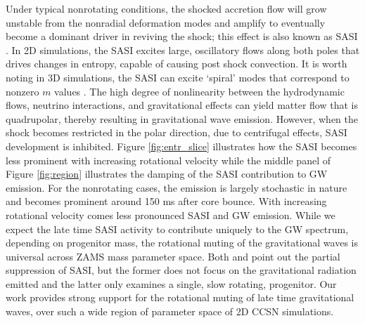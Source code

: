 \documentclass[twocolumn,times]{aastex62}  %
\begin{document}
Under typical nonrotating conditions, the shocked accretion flow will grow unstable from the nonradial deformation modes and amplify to eventually become a dominant driver in reviving the shock; this effect is also known as SASI \citep{scheck:2008,marek:2009a}.  In 2D simulations, the SASI excites large, oscillatory flows along both poles that drives changes in entropy, capable of causing post shock convection.  It is worth noting in 3D simulations, the SASI can excite `spiral' modes that correspond to nonzero $m$ values \citep{blondin:2007,kuroda:2016}.  The high degree of nonlinearity between the hydrodynamic flows, neutrino interactions, and gravitational effects can yield matter flow that is quadrupolar, thereby resulting in gravitational wave emission.  However, when the shock becomes restricted in the polar direction, due to centrifugal effects, SASI development is inhibited. Figure \ref{fig:entr_slice} illustrates how the SASI becomes less prominent with increasing rotational velocity while the middle panel of Figure \ref{fig:region} illustrates the damping of the SASI contribution to GW emission.  For the nonrotating cases, the emission is largely stochastic in nature and becomes prominent around 150 ms after core bounce.  With increasing rotational velocity comes less pronounced SASI and GW emission.  
While we expect the late time SASI activity to contribute uniquely to the GW spectrum, depending on progenitor mass, the rotational muting of the gravitational waves is universal across ZAMS mass parameter space.  
Both \citet{burrows:2007}  and \citet{moro:2018} point out the partial suppression of SASI, but the former does not focus on the gravitational radiation emitted and the latter only examines a single, slow rotating, progenitor.  Our work provides strong support for the rotational muting of late time gravitational waves, over such a wide region of parameter space of 2D CCSN simulations. 
 
\end{document}
